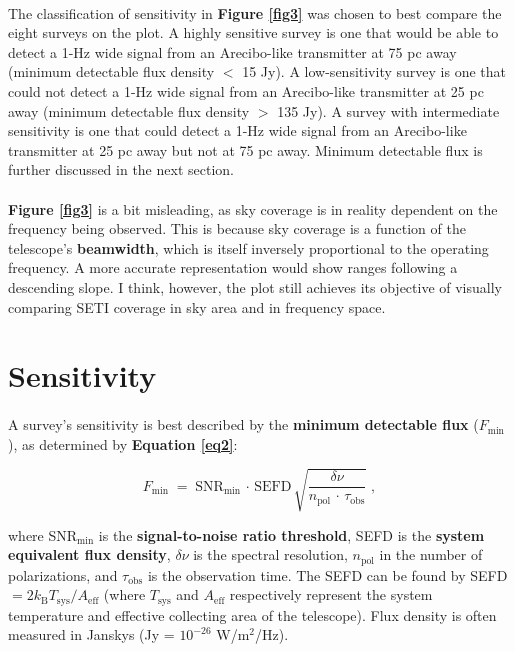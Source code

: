 \documentclass{article}
\begin{document}
\paragraph{}
The classification of sensitivity in \textbf{Figure \ref{fig3}} was chosen to best compare the eight surveys on the plot. A highly sensitive survey is one that would be able to detect a 1-Hz wide signal from an Arecibo-like transmitter at 75 pc away (minimum detectable flux density $<$ 15 Jy). A low-sensitivity survey is one that could not detect a 1-Hz wide signal from an Arecibo-like transmitter at 25 pc away (minimum detectable flux density $>$ 135 Jy). A survey with intermediate sensitivity is one that could detect a 1-Hz wide signal from an Arecibo-like transmitter at 25 pc away but not at 75 pc away. Minimum detectable flux is further discussed in the next section.

\paragraph{}
\textbf{Figure \ref{fig3}} is a bit misleading, as sky coverage is in reality dependent on the frequency being observed. This is because sky coverage is a function of the telescope's \textbf{beamwidth}, which is itself inversely proportional to the operating frequency. A more accurate representation would show ranges following a descending slope. I think, however, the plot still achieves its objective of visually comparing SETI coverage in sky area and in frequency space.


\section{Sensitivity}

\paragraph{}
A survey's sensitivity is best described by the \textbf{minimum detectable flux} ($F_{\textrm{min}}$), as determined by \textbf{Equation \ref{eq2}}:

\begin{equation}
F_{\textrm{min}} \; = \; \textrm{SNR}_{\textrm{min}} \, \cdot \, \textrm{SEFD} \, \sqrt{\frac{\delta \nu}{n_{\textrm{pol}} \, \cdot \, \tau_{\textrm{obs}}}} \; ,
\label{eq2}
\end{equation}

where SNR$_{\textrm{min}}$ is the \textbf{signal-to-noise ratio threshold}, SEFD is the \textbf{system equivalent flux density}, $\delta \nu$ is the spectral resolution, $n_{\textrm{pol}}$ in the number of polarizations, and $\tau_{\textrm{obs}}$ is the observation time. The SEFD can be found by SEFD $= 2 k_{\textrm{B}} T_{\textrm{sys}} / A_{\textrm{eff}}$ (where $T_{\textrm{sys}}$ and $A_{\textrm{eff}}$ respectively represent the system temperature and effective collecting area of the telescope). Flux density is often measured in Janskys (Jy = $10^{-26}$ W/m$^2$/Hz).
\end{document}
